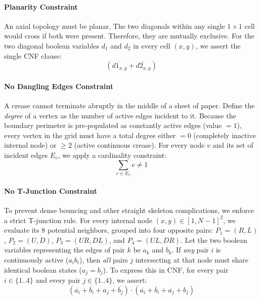 \documentclass[11pt]{article}
\begin{document}
\paragraph{Planarity Constraint}
An axial topology must be planar. The two diagonals within any single $1 \times 1$ cell would cross if both were present. Therefore, they are mutually exclusive. For the two diagonal boolean variables $d_1$ and $d_2$ in every cell $(x,y)$, we assert the single CNF clause:
\begin{equation}
    (\overline{d1_{x,y}} + \overline{d2_{x,y}})
\end{equation}

\paragraph{No Dangling Edges Constraint}
A crease cannot terminate abruptly in the middle of a sheet of paper. Define the \textit{degree} of a vertex as the number of active edges incident to it. Because the boundary perimeter is pre-populated as constantly active edges (value $= 1$), every vertex in the grid must have a total degree either $=0$ (completely inactive internal node) or $\geq 2$ (active continuous crease). For every node $v$ and its set of incident edges $E_v$, we apply a cardinality constraint:
\begin{equation}
    \sum_{e \in E_v} e \neq 1
\end{equation}

\paragraph{No T-Junction Constraint}
To prevent dense bouncing and other straight skeleton complications, we enforce a strict T-junction rule. For every internal node $(x,y) \in [1, N-1]^2$, we evaluate its 8 potential neighbors, grouped into four opposite pairs: $P_1 = (R, L)$, $P_2 = (U, D)$, $P_3 = (UR, DL)$, and $P_4 = (UL, DR)$. Let the two boolean variables representing the edges of pair $k$ be $a_k$ and $b_k$. If \textit{any} pair $i$ is continuously active ($a_i b_i$), then \textit{all} pairs $j$ intersecting at that node must share identical boolean states ($a_j = b_j$). To express this in CNF, for every pair $i \in \{1..4\}$ and every pair $j \in \{1..4\}$, we assert:
\begin{equation}
    (\overline{a_i} + \overline{b_i} + a_j + \overline{b_j}) \cdot (\overline{a_i} + \overline{b_i} + \overline{a_j} + b_j)
\end{equation}
\end{document}
